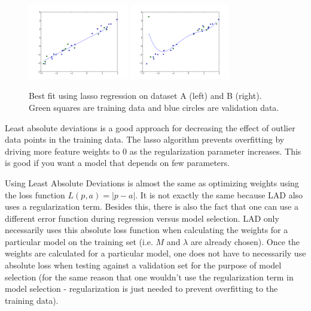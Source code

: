 \documentclass{paper}
\begin{document}
\begin{figure}
	\includegraphics[width=165px]{lasso-A-best-fit.png}
	\includegraphics[width=165px]{lasso-B-best-fit.png}
	\caption{Best fit using lasso regression on dataset A (left) and B (right). Green squares are training data and blue circles are validation data.}
\end{figure}

Least absolute deviations is a good approach for decreasing the effect of outlier data points in the training data. The lasso algorithm prevents overfitting by driving more feature weights to 0 as the regularization parameter increases. This is good if you want a model that depends on few parameters.

Using Least Absolute Deviations is almost the same as optimizing weights using the loss function $L(p, a) = |p - a|$. It is not exactly the same because LAD also uses a regularization term. Besides this, there is also the fact that one can use a different error function during regression versus model selection. LAD only necessarily uses this absolute loss function when calculating the weights for a particular model on the training set (i.e. $M$ and $\lambda$ are already chosen). Once the weights are calculated for a particular model, one does not have to necessarily use absolute loss when testing against a validation set for the purpose of model selection (for the same reason that one wouldn't use the regularization term in model selection - regularization is just needed to prevent overfitting to the training data). 
\end{document}
